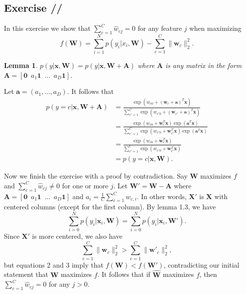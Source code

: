 \documentclass[a4paper,11pt]{article}
\theoremstyle{plain}
\newcounter{exercise}
\newcounter{subexercise}
\newcommand*{\exercise}[1][]{\subsection*{Exercise \ifx/#1/\stepcounter{exercise}\arabic{exercise}\else#1\fi}\setcounter{subexercise}{0}}
\newtheorem{lemma}[theorem]{Lemma}
\begin{document}
\setcounter{exercise}{4}
\exercise
In this exercise we show that $\sum_{c=1}^{C}\hat{w}_{cj}=0$ for any feature $j$ when maximizing
\[
    f(\mathbf{W})=\sum \limits_{i=1}^{N}p(y_i|x_i, \mathbf{W})
    -\sum \limits_{c=1}^{C}\lVert \mathbf{w}_c\rVert_2^2.
\]  
\begin{lemma}
    $p(y|\mathbf{x}, \mathbf{W}) = p(y|\mathbf{x}, \mathbf{W}+\mathbf{A})$ where $\mathbf{A}$
    is any matrix in the form $\mathbf{A}=
    [\mathbf{0}\enspace a_{1}\mathbf{1}\enspace\dots\enspace a_D\mathbf{1}]$.
\end{lemma}
Let $\mathbf{a} = (a_{1}, \dots, a_D)$. It follows that
\begin{align*}
    p(y=c|\mathbf{x}, \mathbf{W}+\mathbf{A}) &=
    \frac{
		\exp(w_{c0} + (\mathbf{w}_{c} + \mathbf{a})^{T}\mathbf{x})
	} {
		\sum_{c'=1}^{C}\exp(w_{c'0}
		+ (\mathbf{w}_{c'}
		+ \mathbf{a})^{T}\mathbf{x})
	} \\
    &= \frac{
		\exp(w_{c0}
		+ \mathbf{w}_{c}^{T}\mathbf{x})\exp(\mathbf{a}^{T}\mathbf{x})
	} {
		\sum_{c'=1}^{C}\exp(w_{c'0}
		+ \mathbf{w}_{c'}^{T}\mathbf{x})\exp(\mathbf{a}^{T}\mathbf{x})
	}\\
    &= \frac{
		\exp(w_{c0} + \mathbf{w}_{c}^{T}\mathbf{x})
	} {
		\sum_{c'=1}^{C}\exp(w_{c'0} + \mathbf{w}_{c'}^{T}\mathbf{x})
	}\\
    &= p(y=c|\mathbf{x}, \mathbf{W}).
\end{align*}

Now we finish the exercise with a proof by contradiction. Say $\mathbf{W}$ maximizes $f$ and
$\sum_{c=1}^{C}\hat{w}_{cj}\neq 0$ for one or more $j$. Let
$\mathbf{W}' = \mathbf{W}- \mathbf{A}$ where
$\mathbf{A} = [\mathbf{0} \enspace a_{1}\mathbf{1} \enspace \dots \enspace a_D\mathbf{1}]$
and $a_i =\frac{1}{C}\sum_{c=1}^{C}w_{c,i}$. In other words, $\mathbf{X}'$ is $\mathbf{X}$ 
with centered columns (except for the first column). By lemma 1.3, we have
\[
    \sum \limits_{i=0}^{N}p(y_i|\mathbf{x}_i, \mathbf{W}) =
    \sum \limits_{i=0}^{N}p(y_i|\mathbf{x}_i, \mathbf{W}').
\]
Since $\mathbf{X}'$ is more centered, we also have
\[
    \sum \limits_{c=1}^{C} \lVert \mathbf{w}_c \rVert_2^2 >
    \sum \limits_{c=1}^{C} \lVert \mathbf{w}'_c \rVert_2^2,
\]
but equations 2 and 3 imply that $f(\mathbf{W})<f(\mathbf{W}')$, contradicting
our initial statement that $\mathbf{W}$ maximizes $f$. It follows that
if $\hat{\mathbf{W}}$ maximizes $f$, then $\sum_{c=1}^{C}\hat{w}_{cj}=0$ for any $j>0$.
\end{document}
